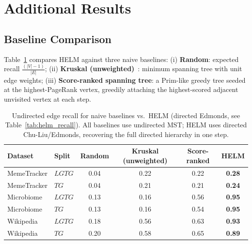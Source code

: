 \documentclass{article}
\begin{document}
    
    

    \newpage
    \appendix

    \section{Additional Results}
    \label{app:additional-results}

    \subsection{Baseline Comparison}
    \label{app:baselines}

    Table~\ref{tab:baselines} compares HELM against three naive baselines: (i) \textbf{Random}: expected recall $\frac{(|V|-1)}{|E|}$; (ii) \textbf{Kruskal (unweighted)}~\citep{kruskal1956shortest}: minimum spanning tree with unit edge weights; (iii) \textbf{Score-ranked spanning tree}: a Prim-like greedy tree seeded at the highest-PageRank vertex, greedily attaching the highest-scored adjacent unvisited vertex at each step.

    \begin{table}[h]
        \centering
        \small
        \begin{tabular}{llcccc}
            \toprule
            \textbf{Dataset} & \textbf{Split} & \textbf{Random} & \textbf{Kruskal (unweighted)} & \textbf{Score-ranked} & \textbf{HELM} \\
            \midrule
            MemeTracker & $LGTG$ & 0.04 & 0.22 & 0.22 & \textbf{0.28} \\
            MemeTracker & $TG$   & 0.04 & 0.21 & 0.21 & \textbf{0.24} \\
            Microbiome  & $LGTG$ & 0.13 & 0.16 & 0.56 & \textbf{0.95} \\
            Microbiome  & $TG$   & 0.13 & 0.16 & 0.54 & \textbf{0.95} \\
            Wikipedia   & $LGTG$ & 0.18 & 0.56 & 0.63 & \textbf{0.93} \\
            Wikipedia   & $TG$   & 0.20 & 0.58 & 0.65 & \textbf{0.89} \\
            \bottomrule
        \end{tabular}
        \caption{Undirected edge recall for naive baselines vs.\ HELM (directed Edmonds, see Table~\ref{tab:helm_recall}). All baselines use undirected MST; HELM uses directed Chu-Liu/Edmonds, recovering the full directed hierarchy in one step.}
        \label{tab:baselines}
    \end{table}
\end{document}
